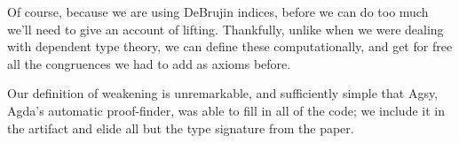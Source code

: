 Of course, because we are using DeBrujin indices, before we can do too much we'll need to give an account of lifting.
Thankfully, unlike when we were dealing with dependent type theory, we can define these computationally, and get for free all the congruences we had to add as axioms before.

Our definition of weakening is unremarkable, and sufficiently simple
that Agsy, Agda's automatic proof-finder, was able to fill in all of
the code; we include it in the artifact and elide all but the type
signature from the paper.


